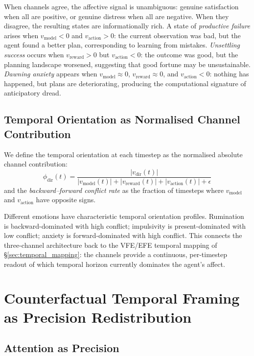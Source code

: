 \documentclass[11pt,a4paper]{article}
\begin{document}
When channels agree, the affective signal is unambiguous: genuine satisfaction when all are positive, or genuine distress when all are negative. When they disagree, the resulting states are informationally rich. A state of \emph{productive failure} arises when $v_{\text{model}} < 0$ and $v_{\text{action}} > 0$: the current observation was bad, but the agent found a better plan, corresponding to learning from mistakes. \emph{Unsettling success} occurs when $v_{\text{reward}} > 0$ but $v_{\text{action}} < 0$: the outcome was good, but the planning landscape worsened, suggesting that good fortune may be unsustainable. \emph{Dawning anxiety} appears when $v_{\text{model}} \approx 0$, $v_{\text{reward}} \approx 0$, and $v_{\text{action}} < 0$: nothing has happened, but plans are deteriorating, producing the computational signature of anticipatory dread.

\subsection{Temporal Orientation as Normalised Channel Contribution}\label{sec:temporal_orientation}

We define the temporal orientation at each timestep as the normalised absolute channel contribution:
\begin{equation}
    \phi_{\text{dir}}(t) = \frac{|v_{\text{dir}}(t)|}{|v_{\text{model}}(t)| + |v_{\text{reward}}(t)| + |v_{\text{action}}(t)| + \epsilon}
\end{equation}
and the \emph{backward--forward conflict rate} as the fraction of timesteps where $v_{\text{model}}$ and $v_{\text{action}}$ have opposite signs.

Different emotions have characteristic temporal orientation profiles. Rumination is backward-dominated with high conflict; impulsivity is present-dominated with low conflict; anxiety is forward-dominated with high conflict. This connects the three-channel architecture back to the VFE/EFE temporal mapping of \S\ref{sec:temporal_mapping}: the channels provide a continuous, per-timestep readout of which temporal horizon currently dominates the agent's affect.


\section{Counterfactual Temporal Framing as Precision Redistribution}\label{sec:counterfactual}

\subsection{Attention as Precision}\label{sec:attention_precision}
\end{document}
